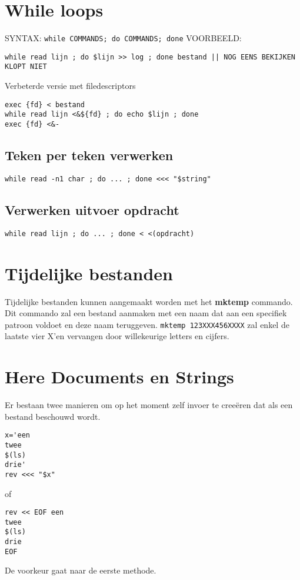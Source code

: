 \documentclass{report}
\begin{document}
\section{While loops}
SYNTAX: \texttt{while COMMANDS; do COMMANDS; done}
VOORBEELD: 
\begin{lstlisting}
while read lijn ; do $lijn >> log ; done bestand || NOG EENS BEKIJKEN KLOPT NIET
\end{lstlisting}

Verbeterde versie met filedescriptors
\begin{lstlisting}
exec {fd} < bestand
while read lijn <&${fd} ; do echo $lijn ; done
exec {fd} <&-
\end{lstlisting}

\subsection{Teken per teken verwerken}
\begin{lstlisting}
while read -n1 char ; do ... ; done <<< "$string"
\end{lstlisting}
\subsection{Verwerken uitvoer opdracht}
\begin{lstlisting}
while read lijn ; do ... ; done < <(opdracht)
\end{lstlisting}
\section{Tijdelijke bestanden}
Tijdelijke bestanden kunnen aangemaakt worden met het \textbf{mktemp} commando. Dit commando zal een bestand aanmaken met een naam dat aan een specifiek patroon voldoet en deze naam teruggeven. \texttt{mktemp 123XXX456XXXX} zal enkel de laatste vier X'en vervangen door willekeurige letters en cijfers. 

\section{Here Documents en Strings}
Er bestaan twee manieren om op het moment zelf invoer te creeëren dat als een bestand beschouwd wordt.

\begin{lstlisting}
x='een
twee
$(ls)
drie'
rev <<< "$x"
\end{lstlisting}
of
\begin{lstlisting}
rev << EOF een
twee
$(ls)
drie
EOF
\end{lstlisting}
De voorkeur gaat naar de eerste methode.
\end{document}
